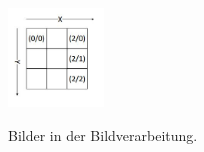 \begin{figure}[ht]
  \centering
  \includegraphics[width=1.0in]{images/koordinatenSystemBildverarbeitung}
  \caption{Bilder in der Bildverarbeitung.}
  \label{fig:Koordinatenursprung oben links}
  \cite{rehfeld}
\end{figure}



\nocite{*}



